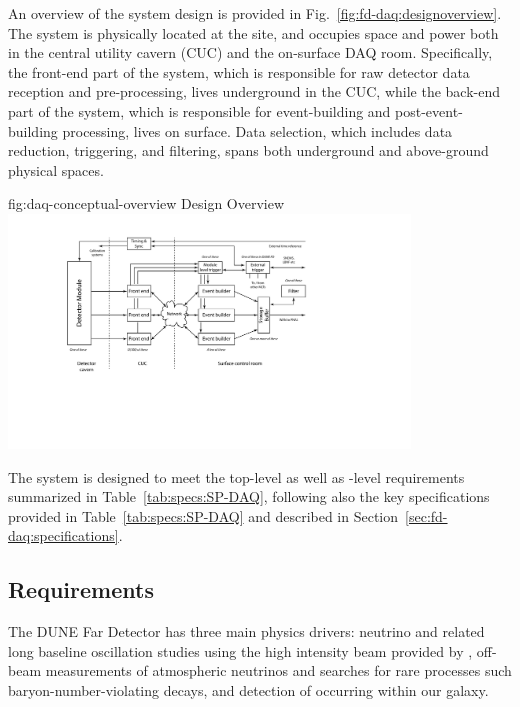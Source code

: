 
An overview of the    system design is
provided in Fig.~\ref{fig:fd-daq:designoverview}. The system is
physically located at the  site, and occupies space and
power both in the central utility cavern (CUC) and the on-surface DAQ
room.  Specifically, the front-end part of the system, which is responsible for
raw detector data reception and pre-processing, lives
underground in the CUC, while the back-end part of the system, which is responsible for
event-building and post-event-building processing, lives on surface. Data selection, which includes
data reduction, triggering, and filtering, spans both underground and
above-ground physical spaces. 

\begin{dunefigure}{fig:daq-conceptual-overview}{ Design Overview}
  \includegraphics[width=0.8\textwidth]{daq-overview.pdf}
\end{dunefigure}

The    system is designed to meet the
 top-level as well as -level requirements
summarized in Table~\ref{tab:specs:SP-DAQ}, following also the key
specifications provided in Table~\ref{tab:specs:SP-DAQ} 
and described in Section~\ref{sec:fd-daq:specifications}. 

\subsection{Requirements}
\label{sec:fd-daq:requirements}

The DUNE Far Detector has three main physics drivers: neutrino  and related
long baseline oscillation studies using the high intensity beam provided
by \fnal, off-beam measurements of atmospheric neutrinos and searches
for rare processes such baryon-number-violating decays,
and detection of  occurring within our galaxy.

